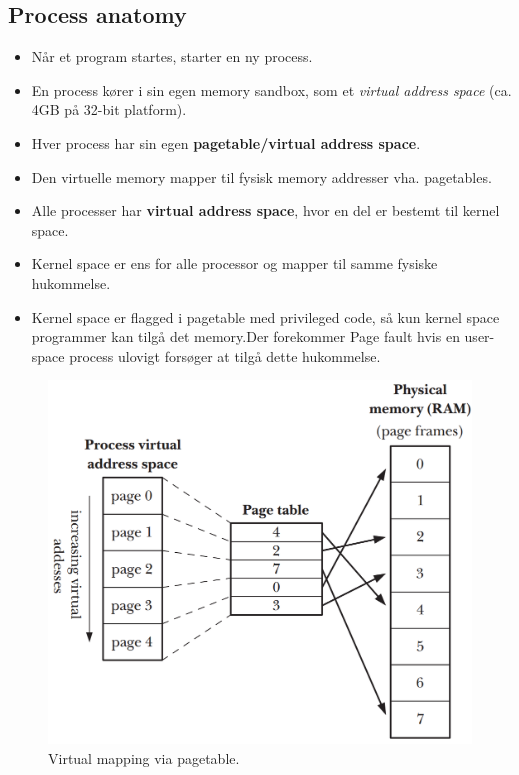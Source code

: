 \subsection{Process anatomy}
\begin{itemize}
	\item Når et program startes, starter en ny process.
	\item En process kører i sin egen memory sandbox, som et \textit{virtual address space} (ca. 4GB på 32-bit platform).
	\item Hver process har sin egen \textbf{pagetable/virtual address space}.
	\item Den virtuelle memory mapper til fysisk memory addresser vha. pagetables.
	\item Alle processer har \textbf{virtual address space}, hvor en del er bestemt til kernel space.
	\item Kernel space er ens for alle processor og mapper til samme fysiske hukommelse.
	\item Kernel space er flagged i pagetable med privileged code, så kun kernel space programmer kan tilgå det memory.Der forekommer Page fault hvis en user-space process ulovigt forsøger at tilgå dette hukommelse.
\end{itemize}

\begin{figure}[h]
	\centering
	\includegraphics[width=0.7\linewidth]{figs/pagetable}
	\caption{Virtual mapping via pagetable.}
	\label{fig:pagetable}
\end{figure}

